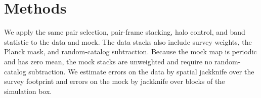 \documentclass[preprint]{aastex701}
\newcommand{\hinvMpc}{h^{-1}{\rm Mpc}}
\begin{document}

\section{Methods}
\label{sec:method}

We apply the same pair selection, pair-frame stacking, halo control, and band
statistic to the data and mock. The data stacks also include survey weights,
the Planck mask, and random-catalog subtraction. Because the mock map is
periodic and has zero mean, the mock stacks are unweighted and require no
random-catalog subtraction. We estimate errors on the data by spatial
jackknife over the survey footprint and errors on the mock by jackknife over
blocks of the simulation box.
\end{document}
